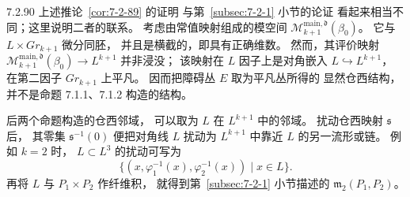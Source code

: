 \begin{remark}{7.2.90}\label{rem:7-2-90}
上述推论~\ref{cor:7-2-89} 的证明
与第~\ref{subsec:7-2-1} 小节的论证
看起来相当不同；这里说明二者的联系。
考虑由常值映射组成的模空间
$\mathcal M^{\mathrm{main},\mathfrak d}_{k+1}(\beta_0)$。
它与 $L\times Gr_{k+1}$ 微分同胚，
并且是横截的，即具有正确维数。
然而，其评价映射
$\mathcal M^{\mathrm{main},\mathfrak d}_{k+1}
(\beta_0)\to L^{k+1}$
并非浸没；
该映射在 $L$ 因子上是对角嵌入
$L\hookrightarrow L^{k+1}$，
在第二因子 $Gr_{k+1}$ 上平凡。
因而把障碍丛 $E$ 取为平凡丛所得的
显然仓西结构，
并不是命题 7.1.1、7.1.2 构造的结构。

后两个命题构造的仓西邻域，
可以取为 $L$ 在 $L^{k+1}$ 中的邻域。
扰动仓西映射 $\mathfrak s$ 后，
其零集 $\mathfrak s^{-1}(0)$
便把对角线 $L$ 扰动为
$L^{k+1}$ 中靠近 $L$ 的另一流形或链。
例如 $k=2$ 时，
$L\subset L^3$ 的扰动可写为
\[
\{(x,\varphi_1^{-1}(x),
\varphi_2^{-1}(x))\mid x\in L\}.
\]
再将 $L$ 与 $P_1\times P_2$ 作纤维积，
就得到第~\ref{subsec:7-2-1} 小节描述的
$\mathfrak m_2(P_1,P_2)$。
\end{remark}
